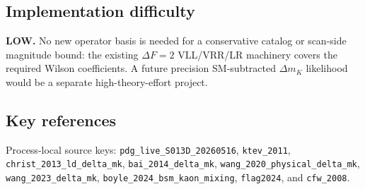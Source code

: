 \subsection*{Implementation difficulty}
\textbf{LOW.}  No new operator basis is needed for a conservative catalog or
scan-side magnitude bound: the existing \(\Delta F=2\) VLL/VRR/LR machinery
covers the required Wilson coefficients.  A future precision SM-subtracted
\(\Delta m_K\) likelihood would be a separate high-theory-effort project.

\subsection*{Key references}
Process-local source keys: \texttt{pdg\_live\_S013D\_20260516},
\texttt{ktev\_2011}, \texttt{christ\_2013\_ld\_delta\_mk},
\texttt{bai\_2014\_delta\_mk}, \texttt{wang\_2020\_physical\_delta\_mk},
\texttt{wang\_2023\_delta\_mk}, \texttt{boyle\_2024\_bsm\_kaon\_mixing},
\texttt{flag2024}, and \texttt{cfw\_2008}.
